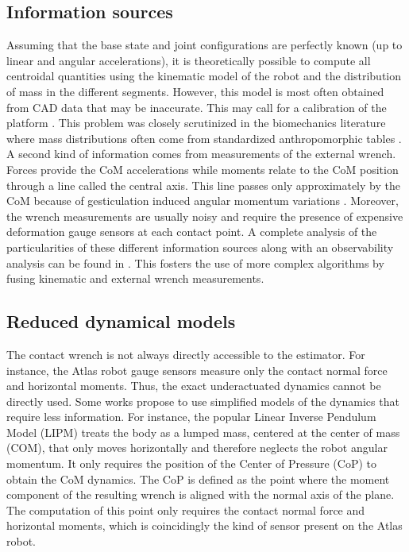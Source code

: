 \subsection{Information sources}
Assuming that the base state and joint configurations are perfectly known (up to linear and angular accelerations), it is theoretically possible 
to compute all centroidal quantities using the kinematic model of the robot and the distribution of mass in the different segments. 
However, this model is most often obtained from CAD data that may be inaccurate. This may call for a calibration of
the platform \cite{ayusawa2008identification, ayusawa2014identifiability, bonnet2018inertial, bonnet2019overview}. 
This problem was closely scrutinized in the biomechanics literature where mass distributions often come from standardized anthropomorphic tables \cite{de1996adjustments}. 
A second kind of information comes from measurements of the external wrench. 
Forces provide the CoM accelerations while moments relate to the CoM position through a line called the central axis. This line passes only approximately by
the CoM because of gesticulation \cite{wieber2000modelisation} induced angular momentum variations \cite{wieber2006holonomy}. Moreover, the wrench measurements 
are usually noisy and require the presence of expensive deformation gauge sensors at each contact point. A complete analysis of the particularities
of these different information sources along with an observability analysis can be found in \cite{carpentier2016center}. 
This fosters the use of more complex algorithms by fusing kinematic and external wrench measurements. 

\subsection{Reduced dynamical models}
The contact wrench is not always directly accessible to the estimator. For instance, the Atlas robot gauge sensors measure only the contact normal force
and horizontal moments. Thus, the exact underactuated dynamics cannot be directly used. Some works propose to use simplified models of the 
dynamics that require less information. For instance, the popular Linear Inverse Pendulum Model (LIPM) \cite{kajita20013d} treats the body as a lumped mass, 
centered at the center of mass (COM), that only moves horizontally and therefore neglects the robot angular momentum. It only requires the position of the 
Center of Pressure (CoP) to obtain the CoM dynamics. The CoP is defined as the point where the moment component of the resulting wrench is aligned with the normal 
axis of the plane. The computation of this point only requires the contact normal force and horizontal moments, which is coincidingly the kind of
sensor present on the Atlas robot.

